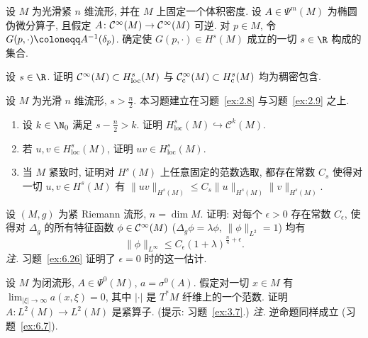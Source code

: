 \begin{exer}\label{ex:5.27}
设 $M$ 为光滑紧 $n$ 维流形, 并在 $M$ 上固定一个体积密度. 设 $A \in \Psi^m(M)$ 为椭圆伪微分算子, 且假定 $A \colon \mathcal{C}^\infty(M) \to \mathcal{C}^\infty(M)$ 可逆. 对 $p \in M$, 令 $G(p, \cdot) \defeq A^{-1}(\delta_p)$. 确定使 $G(p, \cdot) \in H^s(M)$ 成立的一切 $s \in \R$ 构成的集合.
\end{exer}

\begin{exer}[密度]\label{ex:5.28}
设 $s \in \R$. 证明 $\mathcal{C}^\infty(M) \subset H_{\mathrm{loc}}^s(M)$ 与 $\mathcal{C}_{\mathrm{c}}^\infty(M) \subset H_{\mathrm{c}}^s(M)$ 均为稠密包含.
\end{exer}

\begin{exer}\label{ex:5.29}
设 $M$ 为光滑 $n$ 维流形, $s > \frac{n}{2}$. 本习题建立在习题~\ref{ex:2.8} 与习题~\ref{ex:2.9} 之上.
\begin{enumerate}
    \item 设 $k \in \N_0$ 满足 $s - \frac{n}{2} > k$. 证明 $H_{\mathrm{loc}}^s(M) \hookrightarrow \mathcal{C}^k(M)$.
    \item 若 $u, v \in H_{\mathrm{loc}}^s(M)$, 证明 $uv \in H_{\mathrm{loc}}^s(M)$.
    \item 当 $M$ 紧致时, 证明对 $H^s(M)$ 上任意固定的范数选取, 都存在常数 $C_s$ 使得对一切 $u, v \in H^s(M)$ 有 $\|uv\|_{H^s(M)} \le C_s \|u\|_{H^s(M)} \|v\|_{H^s(M)}$.
\end{enumerate}
\end{exer}

\begin{exer}[特征函数的粗略估计]\label{ex:5.30}
设 $(M, g)$ 为紧 Riemann 流形, $n = \dim M$. 证明: 对每个 $\epsilon > 0$ 存在常数 $C_\epsilon$, 使得对 $\Delta_g$ 的所有特征函数 $\phi \in \mathcal{C}^\infty(M)$ ($\Delta_g \phi = \lambda \phi$, $\|\phi\|_{L^2} = 1$) 均有
\begin{equation}\label{eq:5.231}
    \|\phi\|_{L^\infty} \le C_\epsilon (1 + \lambda)^{\frac{n}{4} + \epsilon}.
\end{equation}
\emph{注.} 习题~\ref{ex:6.26} 证明了 $\epsilon = 0$ 时的这一估计.
\end{exer}

\begin{exer}[紧算子]\label{ex:5.31}
设 $M$ 为闭流形, $A \in \Psi^0(M)$, $a = \sigma^0(A)$. 假定对一切 $x \in M$ 有 $\lim_{|\xi| \to \infty} a(x, \xi) = 0$, 其中 $|\cdot|$ 是 $T^* M$ 纤维上的一个范数. 证明 $A \colon L^2(M) \to L^2(M)$ 是紧算子. (提示: 习题~\ref{ex:3.7}.)
\emph{注.} 逆命题同样成立 (习题~\ref{ex:6.7}).
\end{exer}

